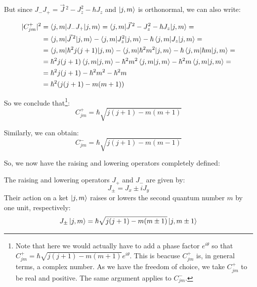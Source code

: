 But since $J_-J_+ = \vec{J}\,^2 - J_z^2 - \hbar J_z$ and $\ket{j,m}$ is orthonormal, we can also write:

\begin{equation}
    \begin{split}
        |C_{jm}^+|^2 &= \braket{j,m|J_-J_+|j,m} = \braket{j,m|\vec{J}\,^2 - J_z^2 - \hbar J_z|j,m} = \\
        &= \braket{j,m|\vec{J}\,^2|j,m} - \braket{j,m|J_z^2|j,m} - \hbar\braket{j,m|J_z|j,m} = \\
        &= \braket{j,m|\hbar^2j(j+1)|j,m} - \braket{j,m|\hbar^2m^2|j,m} - \hbar\braket{j,m|\hbar m|j,m} = \\
        &= \hbar^2j(j+1)\braket{j,m|j,m} - \hbar^2m^2\braket{j,m|j,m} - \hbar^2m\braket{j,m|j,m} = \\
        &= \hbar^2j(j+1) - \hbar^2m^2 - \hbar^2m \\
        &= \hbar^2(j(j+1)-m(m+1))
    \end{split}
\end{equation}

So we conclude that\footnote{Note that here we would actually have to add a phase factor $e^{i\theta}$ so that $C_{jm}^+ = \hbar \sqrt{j(j+1)-m(m+1)}e^{i\theta}$. This is beacuse $C_{jm}^+$ is, in general terms, a complex number. As we have the freedom of choice, we take $C_{jm}^+$ to be real and positive. The same argument applies to $C_{jm}^-$.}:
\begin{equation}
    C_{jm}^+ = \hbar \sqrt{j(j+1)-m(m+1)}
\end{equation}

Similarly, we can obtain:
\begin{equation}
    C_{jm}^- = \hbar \sqrt{j(j+1)-m(m-1)}
\end{equation}

So, we now have the raising and lowering operators completely defined:
\begin{definition}
    The raising and lowering operators $J_+$ and $J_-$ are given by:
    \begin{equation}
        J_\pm = J_x \pm iJ_y
    \end{equation}
    Their action on a ket $\ket{j,m}$ raises or lowers the second quantum number $m$ by one unit, respectively:
    \begin{equation}
        J_\pm\ket{j,m} = \hbar \sqrt{j(j+1)-m(m\pm1)}\ket{j,m\pm 1}
    \end{equation}
\end{definition}